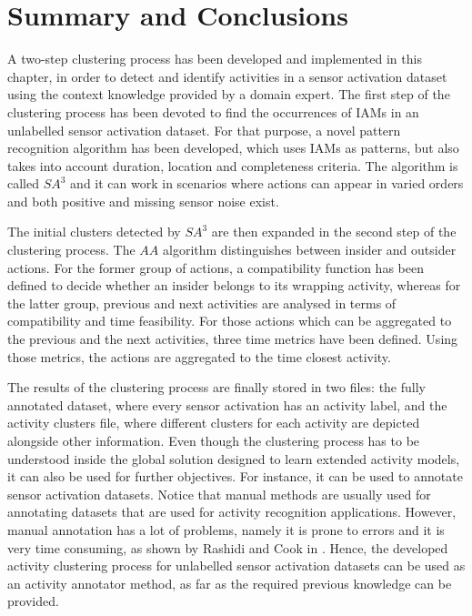 \section{Summary and Conclusions}
\label{sec:clustering:sum}

A two-step clustering process has been developed and implemented in this chapter, in order to detect and identify activities in a sensor activation dataset using the context knowledge provided by a domain expert. The first step of the clustering process has been devoted to find the occurrences of IAMs in an unlabelled sensor activation dataset. For that purpose, a novel pattern recognition algorithm has been developed, which uses IAMs as patterns, but also takes into account duration, location and completeness criteria. The algorithm is called $SA^3$ and it can work in scenarios where actions can appear in varied orders and both positive and missing sensor noise exist.

The initial clusters detected by $SA^3$ are then expanded in the second step of the clustering process. The $AA$ algorithm distinguishes between insider and outsider actions. For the former group of actions, a compatibility function has been defined to decide whether an insider belongs to its wrapping activity, whereas for the latter group, previous and next activities are analysed in terms of compatibility and time feasibility. For those actions which can be aggregated to the previous and the next activities, three time metrics have been defined. Using those metrics, the actions are aggregated to the time closest activity. 

The results of the clustering process are finally stored in two files: the fully annotated dataset, where every sensor activation has an activity label, and the activity clusters file, where different clusters for each activity are depicted alongside other information. Even though the clustering process has to be understood inside the global solution designed to learn extended activity models, it can also be used for further objectives. For instance, it can be used to annotate sensor activation datasets. Notice that manual methods are usually used for annotating datasets that are used for activity recognition applications. However, manual annotation has a lot of problems, namely it is prone to errors and it is very time consuming, as shown by Rashidi and Cook in \cite{Rashidi2011}. Hence, the developed activity clustering process for unlabelled sensor activation datasets can be used as an activity annotator method, as far as the required previous knowledge can be provided. 